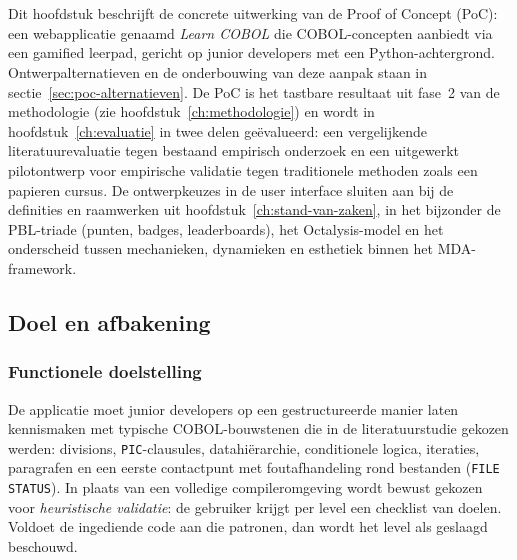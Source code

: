 

\chapter{}%
\label{ch:poc}

Dit hoofdstuk beschrijft de concrete uitwerking van de Proof of Concept (PoC): een webapplicatie genaamd \textit{Learn COBOL} die COBOL-concepten aanbiedt via een gamified leerpad, gericht op junior developers met een Python-achtergrond.
Ontwerpalternatieven en de onderbouwing van deze aanpak staan in sectie~\ref{sec:poc-alternatieven}.
De PoC is het tastbare resultaat uit fase~2 van de methodologie (zie hoofdstuk~\ref{ch:methodologie}) en wordt in hoofdstuk~\ref{ch:evaluatie} in twee delen geëvalueerd: een vergelijkende literatuurevaluatie tegen bestaand empirisch onderzoek en een uitgewerkt pilotontwerp voor empirische validatie tegen traditionele methoden zoals een papieren cursus.
De ontwerpkeuzes in de user interface sluiten aan bij de definities en raamwerken uit hoofdstuk~\ref{ch:stand-van-zaken}, in het bijzonder de PBL-triade (punten, badges, leaderboards), het Octalysis-model en het onderscheid tussen mechanieken, dynamieken en esthetiek binnen het MDA-framework.

\section{Doel en afbakening}

\subsection{Functionele doelstelling}
De applicatie moet junior developers op een gestructureerde manier laten kennismaken met typische COBOL-bouwstenen die in de literatuurstudie gekozen werden: divisions, \texttt{PIC}-clausules, datahiërarchie, conditionele logica, iteraties, paragrafen en een eerste contactpunt met foutafhandeling rond bestanden (\texttt{FILE STATUS}).
In plaats van een volledige compileromgeving wordt bewust gekozen voor \textit{heuristische validatie}: de gebruiker krijgt per level een checklist van doelen. Voldoet de ingediende code aan die patronen, dan wordt het level als geslaagd beschouwd.

